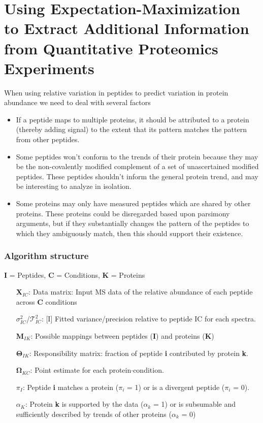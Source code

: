 \chapter{Using Expectation-Maximization to Extract Additional Information from Quantitative Proteomics Experiments\label{proteomicsEM}}

When using relative variation in peptides to predict variation in protein abundance we need to deal with several factors
\begin{itemize}
\item If a peptide maps to multiple proteins, it should be attributed to a protein (thereby adding signal) to the extent that its pattern matches the pattern from other peptides.
\item Some peptides won't conform to the trends of their protein because they may be the non-covalently modified complement of a set of unascertained modified peptides. These peptides shouldn't inform the general protein trend, and may be interesting to analyze in isolation.
\item Some proteins may only have measured peptides which are shared by other proteins. These proteins could be disregarded based upon parsimony arguments, but if they substantially changes the pattern of the peptides to which they ambiguously match, then this should support their existence.
\end{itemize}

\subsection*{Algorithm structure}

\textbf{I} = Peptides, \textbf{C} = Conditions, \textbf{K} = Proteins

\begin{itemize}
\item[\textbf{X}$_{IC}$:] Data matrix: Input MS data of the relative abundance of each peptide across \textbf{C} conditions
\item[$\sigma^{2}_{IC}$/$\mathcal{T}^{2}_{IC}$:] [I] Fitted variance/precision relative to peptide IC for each spectra.
\item[\textbf{M}$_{IK}$:] Possible mappings between peptides (\textbf{I}) and proteins (\textbf{K})
\item[$\mathbf{\Theta}_{IK}$:] Responsibility matrix: fraction of peptide \textbf{i} contributed by protein \textbf{k}.
\item[$\mathbf{\Omega}_{KC}$:] Point estimate for each protein$\cdot$condition.
\item[$\pi_{I}$:] Peptide \textbf{i} matches a protein ($\pi_{i}$ = 1) or is a divergent peptide ($\pi_{i}$ = 0).
\item[$\alpha_{K}$:] Protein \textbf{k} is supported by the data ($\alpha_k$ = 1) or is subsumable and sufficiently described by trends of other proteins ($\alpha_{k}$ = 0)

\end{itemize}

